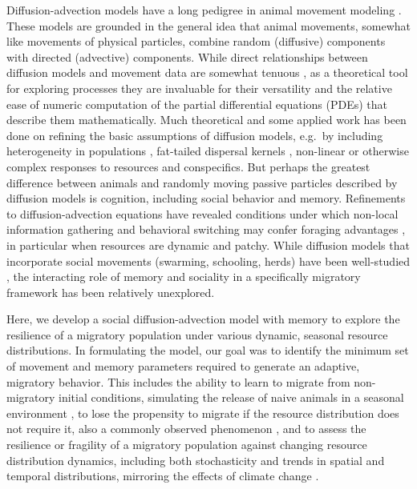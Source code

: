\documentclass[utf8]{frontiersSCNS} %
\begin{document}
Diffusion-advection models have a long pedigree in animal movement modeling \citep{Skellam1951, Turchin1998, Okubo2001}. These models are grounded in the general idea that animal movements, somewhat like movements of physical particles, combine random (diffusive) components with directed (advective) components. While direct relationships between diffusion models and movement data are somewhat tenuous \citep{Gurarie2011,Potts2020}, as a theoretical tool for exploring processes they are invaluable for their versatility and the relative ease of numeric computation of the partial differential equations (PDEs) that describe them mathematically. Much theoretical and some applied work has been done on refining the basic assumptions of diffusion models, e.g.~by including heterogeneity in populations \citep{Skalski2003, Gurarie2009}, fat-tailed dispersal kernels \citep{Kot1996}, non-linear or otherwise complex responses to resources and conspecifics. But perhaps the greatest difference between animals and randomly moving passive particles described by diffusion models is cognition, including social behavior and memory. Refinements to diffusion-advection equations have revealed conditions under which non-local information gathering \citep{Fagan2017} and behavioral switching may confer foraging advantages \citep{Fagan2019}, in particular when resources are dynamic and patchy. While diffusion models that incorporate social movements (swarming, schooling, herds) have been well-studied \citep{Okubo1986,Gruenbaum1994,Mogilner1999}, the interacting role of memory and sociality in a specifically migratory framework has been relatively unexplored. 

Here, we develop a social diffusion-advection model with memory to explore the resilience of a migratory population under various dynamic, seasonal resource distributions. In formulating the model, our goal was to identify the minimum set of movement and memory parameters required to generate an adaptive, migratory behavior. This includes the ability to learn to migrate from non-migratory initial conditions, simulating the release of naive animals in a seasonal environment \citep{Jesmer2018}, to lose the propensity to migrate if the resource distribution does not require it, also a commonly observed phenomenon \citep{Wilcove2008}, and to assess the resilience or fragility of a migratory population against changing resource distribution dynamics, including both stochasticity and trends in spatial and temporal distributions, mirroring the effects of climate change \citep{Park2020}.
\end{document}
